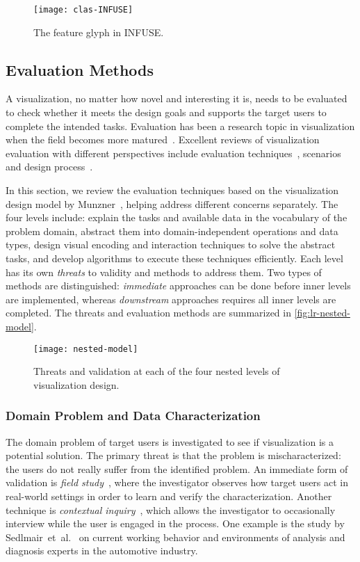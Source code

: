 \begin{figure}[!htb]
	\centering
	\texttt{[image: clas-INFUSE]}
	\caption{The feature glyph in INFUSE. }
	\label{fig:lr-INFUSE}
\end{figure}

\subsection{Evaluation Methods}
\label{sub:lr-evaluation}
A visualization, no matter how novel and interesting it is, needs to be evaluated to check whether it meets the design goals and supports the target users to complete the intended tasks. Evaluation has been a research topic in visualization when the field becomes more matured~\cite{Plaisant2004}. Excellent reviews of visualization evaluation with different perspectives include evaluation techniques~\cite{Carpendale2008}, scenarios~\cite{Lam2012} and design process~\cite{Munroe2009}.

In this section, we review the evaluation techniques based on the visualization design model by Munzner~\cite{Munroe2009}, helping address different concerns separately. The four levels include: explain the tasks and available data in the vocabulary of the problem domain, abstract them into domain-independent operations and data types, design visual encoding and interaction techniques to solve the abstract tasks, and develop algorithms to execute these techniques efficiently. Each level has its own \emph{threats} to validity and methods to address them. Two types of methods are distinguished: \emph{immediate} approaches can be done before inner levels are implemented, whereas \emph{downstream} approaches requires all inner levels are completed. The threats and evaluation methods are summarized in \autoref{fig:lr-nested-model}.

\begin{figure}[!htb]
	\centering
	\texttt{[image: nested-model]}
	\caption{Threats and validation at each of the four nested levels of visualization design. }
	\label{fig:lr-nested-model}
\end{figure}

\subsubsection{Domain Problem and Data Characterization}
The domain problem of target users is investigated to see if visualization is a potential solution. The primary threat is that the problem is mischaracterized: the users do not really suffer from the identified problem. An immediate form of validation is \emph{field study}~\cite{Carpendale2008}, where the investigator observes how target users act in real-world settings in order to learn and verify the characterization. Another technique is \emph{contextual inquiry}~\cite{Holtzblatt1993}, which allows the investigator to occasionally interview while the user is engaged in the process. One example is the study by Sedlmair~et~al.~\cite{Sedlmair2008} on current working behavior and environments of analysis and diagnosis experts in the automotive industry.


